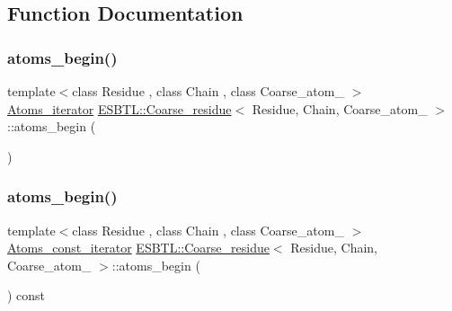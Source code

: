 \subsection{Function Documentation}
\mbox{\label{group__grp__iters_ga35aadf6bfc69effe4dd4a55b09e8a1ca}} 
\subsubsection{\texorpdfstring{atoms\+\_\+begin()}{atoms\_begin()}\hspace{0.1cm}{\footnotesize\ttfamily [1/8]}}
{\footnotesize\ttfamily template$<$class Residue , class Chain , class Coarse\+\_\+atom\+\_\+ $>$ \\
\hyperlink{group__grp__iters_ga8081408a6d91ed2a777111e2b2651ad4}{Atoms\+\_\+iterator} \hyperlink{classESBTL_1_1Coarse__residue}{E\+S\+B\+T\+L\+::\+Coarse\+\_\+residue}$<$ Residue, Chain, Coarse\+\_\+atom\+\_\+ $>$\+::atoms\+\_\+begin (\begin{DoxyParamCaption}{ }\end{DoxyParamCaption})\hspace{0.3cm}{\ttfamily [inline]}}

\mbox{\label{group__grp__iters_ga9f73288663701102c207280c7af5a523}} 
\subsubsection{\texorpdfstring{atoms\+\_\+begin()}{atoms\_begin()}\hspace{0.1cm}{\footnotesize\ttfamily [2/8]}}
{\footnotesize\ttfamily template$<$class Residue , class Chain , class Coarse\+\_\+atom\+\_\+ $>$ \\
\hyperlink{group__grp__iters_gabb95e73700fd84dbde6e089927e03a6d}{Atoms\+\_\+const\+\_\+iterator} \hyperlink{classESBTL_1_1Coarse__residue}{E\+S\+B\+T\+L\+::\+Coarse\+\_\+residue}$<$ Residue, Chain, Coarse\+\_\+atom\+\_\+ $>$\+::atoms\+\_\+begin (\begin{DoxyParamCaption}{ }\end{DoxyParamCaption}) const\hspace{0.3cm}{\ttfamily [inline]}}

